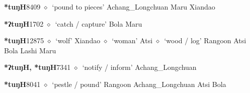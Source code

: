   \begin{list}{}{\leftmargin=1.5em \itemindent=-1.5em}
  \item {\footnotesize \textbf{*tuŋH}}{\tiny 8409}
         $\diamond$~`pound to pieces'
         Achang\_Longchuan 
\hspace{1ex}
         Maru 
\hspace{1ex}
         Xiandao 
  \item {\footnotesize \textbf{*ʔtuŋH}}{\tiny 1702}
\hspace{1ex}
         $\diamond$~`catch / capture'
         Bola 
\hspace{1ex}
         Maru 
  \item {\footnotesize \textbf{*tuŋH}}{\tiny 12875}
\hspace{1ex}
         $\diamond$~`wolf'
         Xiandao 
\hspace{1ex}
         $\diamond$~`woman'
         Atsi 
\hspace{1ex}
         $\diamond$~`wood / log'
         Rangoon 
\hspace{1ex}
         Atsi 
\hspace{1ex}
         Bola 
\hspace{1ex}
         Lashi 
\hspace{1ex}
         Maru 
  \item {\footnotesize \textbf{*ʔtuŋH, *tuŋH}}{\tiny 7341}
\hspace{1ex}
         $\diamond$~`notify / inform'
         Achang\_Longchuan 
  \item {\footnotesize \textbf{*tuŋH}}{\tiny 8041}
\hspace{1ex}
         $\diamond$~`pestle / pound'
         Rangoon 
\hspace{1ex}
         Achang\_Longchuan 
\hspace{1ex}
         Atsi 
\hspace{1ex}
         Bola 

\end{list}
